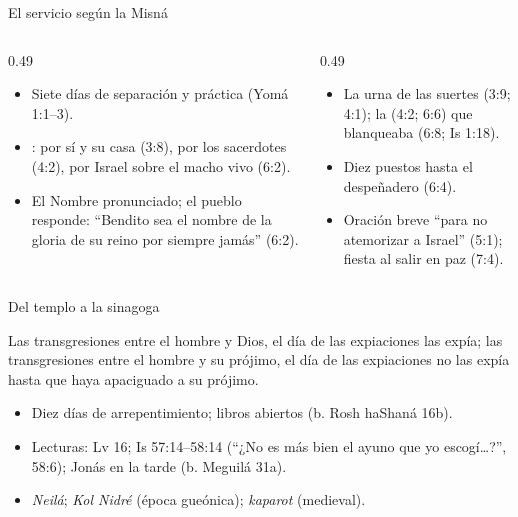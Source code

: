 \begin{frame}{El servicio según la Misná}
\scriptsize
\begin{columns}[t,onlytextwidth]
\begin{column}{0.49\textwidth}
\begin{itemize}
\item Siete días de separación y práctica (Yomá 1:1--3).
\item {}: por sí y su casa (3:8), por los sacerdotes (4:2), por Israel sobre el macho vivo (6:2).
\item El Nombre pronunciado; el pueblo responde: ``Bendito sea el nombre de la gloria de su reino por siempre jamás'' (6:2).
\end{itemize}
\end{column}
\begin{column}{0.49\textwidth}
\begin{itemize}
\item La urna de las suertes (3:9; 4:1); la  (4:2; 6:6) que blanqueaba (6:8; Is 1:18).
\item Diez puestos hasta el despeñadero (6:4).
\item Oración breve ``para no atemorizar a Israel'' (5:1); fiesta al salir en paz (7:4).
\end{itemize}
\end{column}
\end{columns}\par\medskip
{}
\end{frame}

\begin{frame}{Del templo a la sinagoga}
\begin{cita}[fontupper=\scriptsize\itshape]Las transgresiones entre el hombre y Dios, el día de las expiaciones las expía; las transgresiones entre el hombre y su prójimo, el día de las expiaciones no las expía hasta que haya apaciguado a su prójimo.\end{cita}
\scriptsize
\begin{itemize}\setlength{\itemsep}{1pt}
\item Diez días de arrepentimiento; libros abiertos (b. Rosh haShaná 16b).
\item Lecturas: Lv 16; Is 57:14--58:14 (``¿No es más bien el ayuno que yo escogí\ldots?'', 58:6); Jonás en la tarde (b. Meguilá 31a).
\item \emph{Neilá}; \emph{Kol Nidré} (época gueónica); \emph{kaparot} (medieval).
\end{itemize}
\end{frame}

